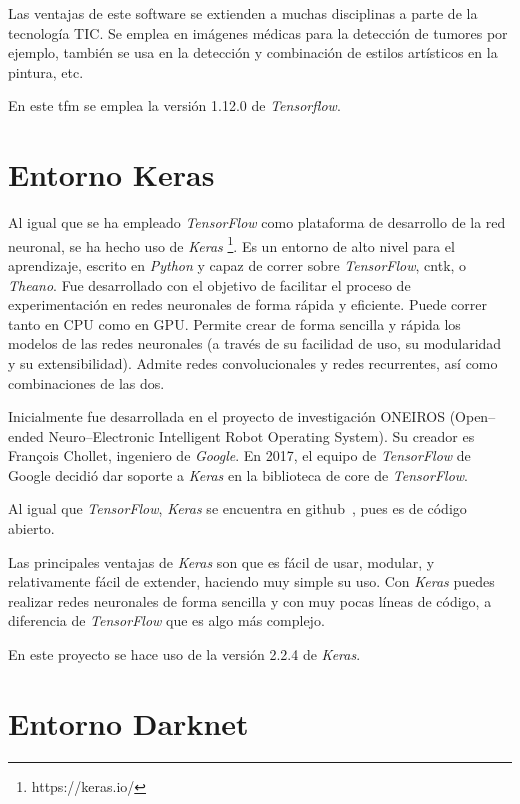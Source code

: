 Las ventajas de este software se extienden a muchas disciplinas a parte de la tecnología TIC. Se emplea en imágenes médicas para la detección de tumores por ejemplo, también se usa en la detección y combinación de estilos artísticos en la pintura, etc.

En este \acrshort{tfm} se emplea la versión 1.12.0 de \textit{Tensorflow}.

\section{Entorno Keras}

Al igual que se ha empleado \textit{TensorFlow} como plataforma de desarrollo de la red neuronal, se ha hecho uso de \textit{Keras} \footnote{https://keras.io/}. Es un entorno de alto nivel para el aprendizaje, escrito en \textit{Python} y capaz de correr sobre \textit{TensorFlow}, \acrshort{cntk}, o \textit{Theano}. Fue desarrollado con el objetivo de facilitar el proceso de experimentación en redes neuronales de forma rápida y eficiente. Puede correr tanto en CPU como en GPU. Permite crear de forma sencilla y rápida los modelos de las redes neuronales (a través de su facilidad de uso, su modularidad y su extensibilidad). Admite redes convolucionales y redes recurrentes, así como combinaciones de las dos.

Inicialmente fue desarrollada en el proyecto de investigación ONEIROS (Open--ended Neuro--Electronic Intelligent Robot Operating System). Su creador es Fran\c{c}ois Chollet, ingeniero de \textit{Google}.
En 2017, el equipo de \textit{TensorFlow} de Google decidió dar soporte a \textit{Keras} en la biblioteca de core de \textit{TensorFlow}.

Al igual que \textit{TensorFlow}, \textit{Keras} se encuentra en github~\cite{keras_github}, pues es de código abierto. 

Las principales ventajas de \textit{Keras} son que es fácil de usar, modular, y relativamente fácil de extender, haciendo muy simple su uso. Con \textit{Keras} puedes realizar redes neuronales de forma sencilla y con muy pocas líneas de código, a diferencia de \textit{TensorFlow} que es algo más complejo. 

En este proyecto se hace uso de la versión 2.2.4 de \textit{Keras}.


\section{Entorno Darknet}\label{sec.yolo}

